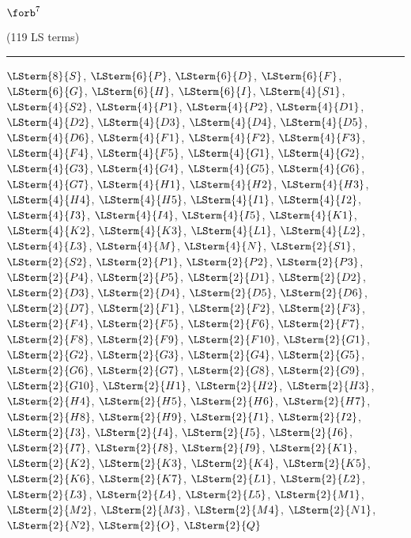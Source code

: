 \begin{mdframed}\begin{center}
$\forb^{7}$

(119 LS terms)
\vspace{0.25cm}\hrule\vspace{0.25cm}

$\LSterm{8}{S}$, $\LSterm{6}{P}$, $\LSterm{6}{D}$, $\LSterm{6}{F}$, $\LSterm{6}{G}$, $\LSterm{6}{H}$, $\LSterm{6}{I}$, $\LSterm{4}{S1}$, $\LSterm{4}{S2}$, $\LSterm{4}{P1}$, $\LSterm{4}{P2}$, $\LSterm{4}{D1}$, $\LSterm{4}{D2}$, $\LSterm{4}{D3}$, $\LSterm{4}{D4}$, $\LSterm{4}{D5}$, $\LSterm{4}{D6}$, $\LSterm{4}{F1}$, $\LSterm{4}{F2}$, $\LSterm{4}{F3}$, $\LSterm{4}{F4}$, $\LSterm{4}{F5}$, $\LSterm{4}{G1}$, $\LSterm{4}{G2}$, $\LSterm{4}{G3}$, $\LSterm{4}{G4}$, $\LSterm{4}{G5}$, $\LSterm{4}{G6}$, $\LSterm{4}{G7}$, $\LSterm{4}{H1}$, $\LSterm{4}{H2}$, $\LSterm{4}{H3}$, $\LSterm{4}{H4}$, $\LSterm{4}{H5}$, $\LSterm{4}{I1}$, $\LSterm{4}{I2}$, $\LSterm{4}{I3}$, $\LSterm{4}{I4}$, $\LSterm{4}{I5}$, $\LSterm{4}{K1}$, $\LSterm{4}{K2}$, $\LSterm{4}{K3}$, $\LSterm{4}{L1}$, $\LSterm{4}{L2}$, $\LSterm{4}{L3}$, $\LSterm{4}{M}$, $\LSterm{4}{N}$, $\LSterm{2}{S1}$, $\LSterm{2}{S2}$, $\LSterm{2}{P1}$, $\LSterm{2}{P2}$, $\LSterm{2}{P3}$, $\LSterm{2}{P4}$, $\LSterm{2}{P5}$, $\LSterm{2}{D1}$, $\LSterm{2}{D2}$, $\LSterm{2}{D3}$, $\LSterm{2}{D4}$, $\LSterm{2}{D5}$, $\LSterm{2}{D6}$, $\LSterm{2}{D7}$, $\LSterm{2}{F1}$, $\LSterm{2}{F2}$, $\LSterm{2}{F3}$, $\LSterm{2}{F4}$, $\LSterm{2}{F5}$, $\LSterm{2}{F6}$, $\LSterm{2}{F7}$, $\LSterm{2}{F8}$, $\LSterm{2}{F9}$, $\LSterm{2}{F10}$, $\LSterm{2}{G1}$, $\LSterm{2}{G2}$, $\LSterm{2}{G3}$, $\LSterm{2}{G4}$, $\LSterm{2}{G5}$, $\LSterm{2}{G6}$, $\LSterm{2}{G7}$, $\LSterm{2}{G8}$, $\LSterm{2}{G9}$, $\LSterm{2}{G10}$, $\LSterm{2}{H1}$, $\LSterm{2}{H2}$, $\LSterm{2}{H3}$, $\LSterm{2}{H4}$, $\LSterm{2}{H5}$, $\LSterm{2}{H6}$, $\LSterm{2}{H7}$, $\LSterm{2}{H8}$, $\LSterm{2}{H9}$, $\LSterm{2}{I1}$, $\LSterm{2}{I2}$, $\LSterm{2}{I3}$, $\LSterm{2}{I4}$, $\LSterm{2}{I5}$, $\LSterm{2}{I6}$, $\LSterm{2}{I7}$, $\LSterm{2}{I8}$, $\LSterm{2}{I9}$, $\LSterm{2}{K1}$, $\LSterm{2}{K2}$, $\LSterm{2}{K3}$, $\LSterm{2}{K4}$, $\LSterm{2}{K5}$, $\LSterm{2}{K6}$, $\LSterm{2}{K7}$, $\LSterm{2}{L1}$, $\LSterm{2}{L2}$, $\LSterm{2}{L3}$, $\LSterm{2}{L4}$, $\LSterm{2}{L5}$, $\LSterm{2}{M1}$, $\LSterm{2}{M2}$, $\LSterm{2}{M3}$, $\LSterm{2}{M4}$, $\LSterm{2}{N1}$, $\LSterm{2}{N2}$, $\LSterm{2}{O}$, $\LSterm{2}{Q}$
\end{center}\end{mdframed}

